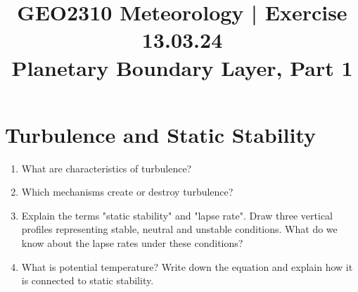 \documentclass{article}
\begin{document}
\title{GEO2310 Meteorology | Exercise 13.03.24\\ Planetary Boundary Layer, Part 1 }
\date{}
\maketitle

\vspace{-1.3cm}

\section{Turbulence and Static Stability}
\begin{enumerate}[label=(\alph*)]
    \item What are characteristics of turbulence? %
    \item Which mechanisms create or destroy turbulence? %
    \item Explain the terms "static stability" and "lapse rate". Draw three vertical profiles representing stable, neutral and unstable conditions. What do we know about the lapse rates under these conditions? %
    \item What is potential temperature? Write down the equation and explain how it is connected to static stability. %
\end{enumerate}
\end{document}
